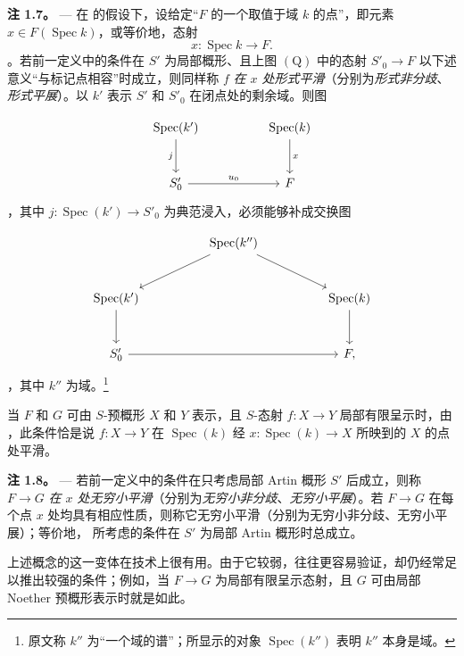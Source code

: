 
\medskip\noindent{}\textbf{注 1.7。} --- 在  的假设下，设给定“\(F\) 的一个取值于域 \(k\) 的点”，即元素 \(x\in F(\operatorname{Spec}k)\)，或等价地，态射 \[
  x:\operatorname{Spec}k\longrightarrow F.
\]。若前一定义中的条件在 \(S'\) 为局部概形、且上图 \(\mathrm{(Q)}\) 中的态射 \(S'_0\to F\) 以下述意义“与标记点相容”时成立，则同样称 \(f\) \emph{在 \(x\) 处形式平滑}（分别为\emph{形式非分歧}、\emph{形式平展}）。以 \(k'\) 表示 \(S'\) 和 \(S'_0\) 在闭点处的剩余域。则图

 \[
\begin{tikzcd}[column sep=huge,row sep=large]
  \operatorname{Spec}(k') \arrow[d,"j"'] &
    \operatorname{Spec}(k) \arrow[d,"x"] \\
  S'_0 \arrow[r,"u_0"] & F
\end{tikzcd}
\]，其中 \(j:\operatorname{Spec}(k')\to S'_0\) 为典范浸入，必须能够补成交换图

 \[
\begin{tikzcd}[column sep=huge,row sep=large]
  & \operatorname{Spec}(k'') \arrow[dl] \arrow[dr] & \\
  \operatorname{Spec}(k') \arrow[d] &&
    \operatorname{Spec}(k) \arrow[d] \\
  S'_0 \arrow[rr] && F ,
\end{tikzcd}
\]，其中 \(k''\) 为域。\footnote{原文称 \(k''\) 为“一个域的谱”；所显示的对象 \(\operatorname{Spec}(k'')\) 表明 \(k''\) 本身是域。}

当 \(F\) 和 \(G\) 可由 \(S\)-预概形 \(X\) 和 \(Y\) 表示，且 \(S\)-态射 \(f:X\to Y\) 局部有限呈示时，由 ，此条件恰是说 \(f:X\to Y\) 在 \(\operatorname{Spec}(k)\) 经 \(x:\operatorname{Spec}(k)\to X\) 所映到的 \(X\) 的点处平滑。

\medskip\noindent{}\textbf{注 1.8。} --- 若前一定义中的条件在只考虑局部 Artin 概形 \(S'\) 后成立，则称 \(F\to G\) \emph{在 \(x\) 处无穷小平滑}（分别为\emph{无穷小非分歧}、\emph{无穷小平展}）。若 \(F\to G\) 在每个点 \(x\) 处均具有相应性质，则称它无穷小平滑（分别为无穷小非分歧、无穷小平展）；等价地， 所考虑的条件在 \(S'\) 为局部 Artin 概形时总成立。

上述概念的这一变体在技术上很有用。由于它较弱，往往更容易验证，却仍经常足以推出较强的条件；例如，当 \(F\to G\) 为局部有限呈示态射，且 \(G\) 可由局部 Noether 预概形表示时就是如此。


